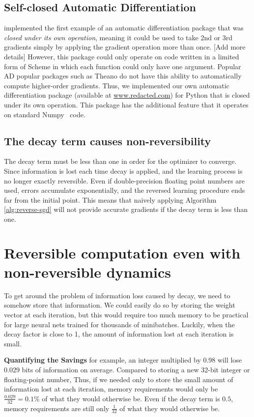 \documentclass{article}
\begin{document}
\subsection{Self-closed Automatic Differentiation}
\citet{pearlmutter2008reverse} implemented the first example of an automatic differentiation package that was \emph{closed under its own operation}, meaning it could be used to take 2nd or 3rd gradients simply by applying the gradient operation more than once. [Add more details]
However, this package could only operate on code written in a limited form of Scheme in which each function could only have one argument.
Popular AD popular packages such as Theano do not have this ability to automatically compute higher-order gradients.
Thus, we implemented our own automatic differentiation package (available at \url{www.redacted.com}) for Python that is closed under its own operation.
This package has the additional feature that it operates on standard Numpy~\cite{oliphant2007python} code.

\subsection{The decay term causes non-reversibility}
The decay term must be less than one in order for the optimizer to converge.
Since information is lost each time decay is applied, and the learning process is no longer exactly reversible.
Even if double-precision floating point numbers are used, errors accumulate exponentially, and the reversed learning procedure ends far from the initial point.
This means that naively applying Algorithm \ref{alg:reverse-sgd} will not provide accurate gradients if the decay term is less than one.

\section{Reversible computation even with non-reversible dynamics}
\label{sec:reversible computation}
To get around the problem of information loss caused by decay, we need to somehow store that information.
We could easily do so by storing the weight vector at each iteration, but this would require too much memory to be practical for large neural nets trained for thousands of minibatches.
Luckily, when the decay factor is close to 1, the amount of information lost at each iteration is small.

\textbf{Quantifying the Savings}
for example, an integer multiplied by 0.98 will lose $0.029$ bits of information on average.
Compared to storing a new 32-bit integer or floating-point number, 
Thus, if we needed only to store the small amount of information lost at each iteration, memory requirements would only be ${\frac{0.029}{32} = 0.1\%}$ of what they would otherwise be.
Even if the decay term is $0.5$, memory requirements are still only $\frac{1}{32}$ of what they would otherwise be.
\end{document}
